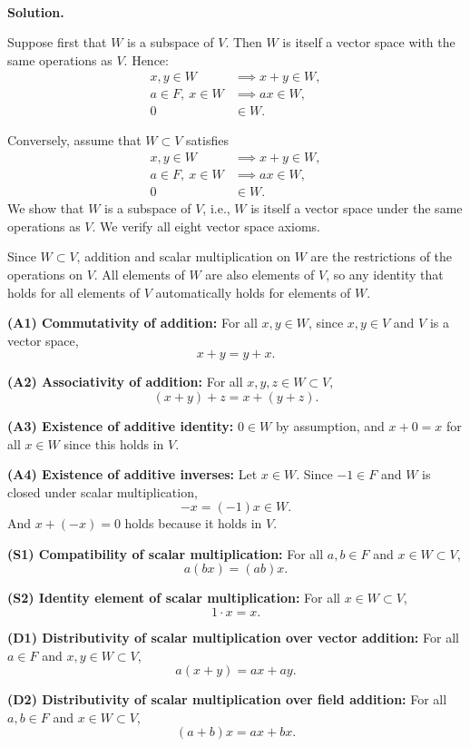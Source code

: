 \documentclass{article}
\begin{document}
\noindent\\
\textbf{Solution.}
\begin{mdframed}[linewidth=1pt]
Suppose first that $W$ is a subspace of $V$. Then $W$ is itself a vector space with the same operations as $V$. Hence:
\begin{align*}
x,y\in W &\implies x+y\in W, \\
a\in F,\ x\in W &\implies ax\in W, \\
0&\in W.
\end{align*}

Conversely, assume that $W\subset V$ satisfies
\begin{align*}
x,y\in W &\implies x+y\in W, \\
a\in F,\ x\in W &\implies ax\in W, \\
0&\in W.
\end{align*}
We show that $W$ is a subspace of $V$, i.e., $W$ is itself a vector space under the same operations as $V$. We verify all eight vector space axioms.

Since $W \subset V$, addition and scalar multiplication on $W$ are the restrictions of the operations on $V$. All elements of $W$ are also elements of $V$, so any identity that holds for all elements of $V$ automatically holds for elements of $W$.

\textbf{(A1) Commutativity of addition:} For all $x, y \in W$, since $x, y \in V$ and $V$ is a vector space,
\[
x + y = y + x.
\]

\textbf{(A2) Associativity of addition:} For all $x, y, z \in W \subset V$,
\[
(x + y) + z = x + (y + z).
\]

\textbf{(A3) Existence of additive identity:} $0 \in W$ by assumption, and $x + 0 = x$ for all $x \in W$ since this holds in $V$.

\textbf{(A4) Existence of additive inverses:} Let $x \in W$. Since $-1 \in F$ and $W$ is closed under scalar multiplication,
\[
-x = (-1)x \in W.
\]
And $x + (-x) = 0$ holds because it holds in $V$.

\textbf{(S1) Compatibility of scalar multiplication:} For all $a, b \in F$ and $x \in W \subset V$,
\[
a(bx) = (ab)x.
\]

\textbf{(S2) Identity element of scalar multiplication:} For all $x \in W \subset V$,
\[
1 \cdot x = x.
\]

\textbf{(D1) Distributivity of scalar multiplication over vector addition:} For all $a \in F$ and $x, y \in W \subset V$,
\[
a(x + y) = ax + ay.
\]

\textbf{(D2) Distributivity of scalar multiplication over field addition:} For all $a, b \in F$ and $x \in W \subset V$,
\[
(a + b)x = ax + bx.
\]


\end{mdframed}
\end{document}
